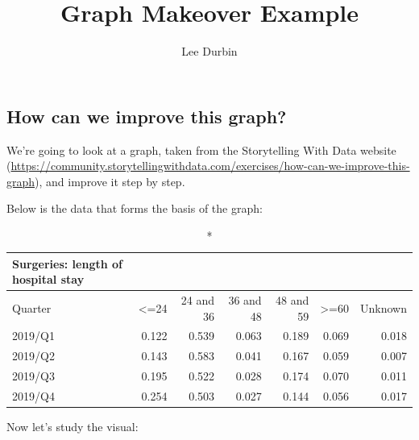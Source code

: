 \documentclass[
  letterpaper,
  DIV=11,
  numbers=noendperiod]{scrartcl}
\title{Graph Makeover Example}
\author{Lee Durbin}
\date{}
\begin{document}
\maketitle
\ifdefined\Shaded\renewenvironment{Shaded}{\begin{tcolorbox}[sharp corners, frame hidden, borderline west={3pt}{0pt}{shadecolor}, interior hidden, enhanced, boxrule=0pt, breakable]}{\end{tcolorbox}}\fi

\hypertarget{how-can-we-improve-this-graph}{%
\subsection{How can we improve this
graph?}\label{how-can-we-improve-this-graph}}

We're going to look at a graph, taken from the Storytelling With Data
website
(\url{https://community.storytellingwithdata.com/exercises/how-can-we-improve-this-graph}),
and improve it step by step.

Below is the data that forms the basis of the graph:

\captionsetup[table]{labelformat=empty,skip=1pt}
\begin{longtable}{lrrrrrr}
\caption*{
{\large Surgeries: length of hospital stay}
} \\ 
\toprule
Quarter & <=24 & 24 and 36 & 36 and 48 & 48 and 59 & >=60 & Unknown \\ 
\midrule
2019/Q1 & 0.122 & 0.539 & 0.063 & 0.189 & 0.069 & 0.018 \\ 
2019/Q2 & 0.143 & 0.583 & 0.041 & 0.167 & 0.059 & 0.007 \\ 
2019/Q3 & 0.195 & 0.522 & 0.028 & 0.174 & 0.070 & 0.011 \\ 
2019/Q4 & 0.254 & 0.503 & 0.027 & 0.144 & 0.056 & 0.017 \\ 
\bottomrule
\end{longtable}

Now let's study the visual:
\end{document}
